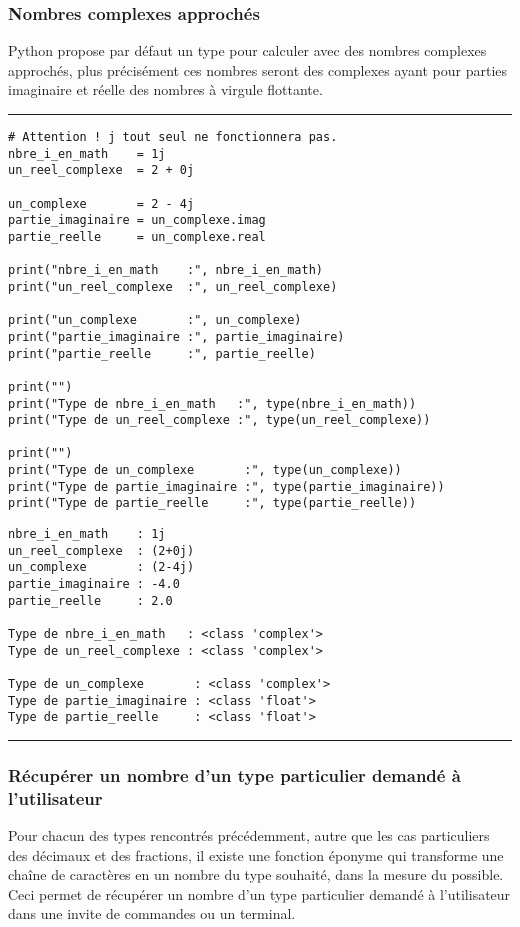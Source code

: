 \subsubsection{Nombres complexes approchés}

Python propose par défaut un type pour calculer avec des nombres complexes approchés, plus précisément ces nombres seront des complexes ayant pour parties imaginaire et réelle des nombres à virgule flottante.


\bigskip
{\hrule height .5mm}
\begin{verbatim}
# Attention ! j tout seul ne fonctionnera pas.
nbre_i_en_math    = 1j
un_reel_complexe  = 2 + 0j

un_complexe       = 2 - 4j
partie_imaginaire = un_complexe.imag
partie_reelle     = un_complexe.real

print("nbre_i_en_math    :", nbre_i_en_math)
print("un_reel_complexe  :", un_reel_complexe)

print("un_complexe       :", un_complexe)
print("partie_imaginaire :", partie_imaginaire)
print("partie_reelle     :", partie_reelle)

print("")
print("Type de nbre_i_en_math   :", type(nbre_i_en_math))
print("Type de un_reel_complexe :", type(un_reel_complexe))

print("")
print("Type de un_complexe       :", type(un_complexe))
print("Type de partie_imaginaire :", type(partie_imaginaire))
print("Type de partie_reelle     :", type(partie_reelle))
\end{verbatim}
 \color{ForestGreen}
\vspace{-1.5em}
\begin{verbatim}
nbre_i_en_math    : 1j
un_reel_complexe  : (2+0j)
un_complexe       : (2-4j)
partie_imaginaire : -4.0
partie_reelle     : 2.0

Type de nbre_i_en_math   : <class 'complex'>
Type de un_reel_complexe : <class 'complex'>

Type de un_complexe       : <class 'complex'>
Type de partie_imaginaire : <class 'float'>
Type de partie_reelle     : <class 'float'>
\end{verbatim} \color{Black}
{\hrule height .5mm}
\bigskip


\subsubsection{Récupérer un nombre d'un type particulier demandé à l'utilisateur}

Pour chacun des types rencontrés précédemment, autre que les cas particuliers des décimaux et des fractions, il existe une fonction éponyme qui transforme une chaîne de caractères en un nombre du type souhaité, dans la mesure du possible. Ceci permet de récupérer un nombre d'un type particulier demandé à l'utilisateur dans une invite de commandes ou un terminal.


